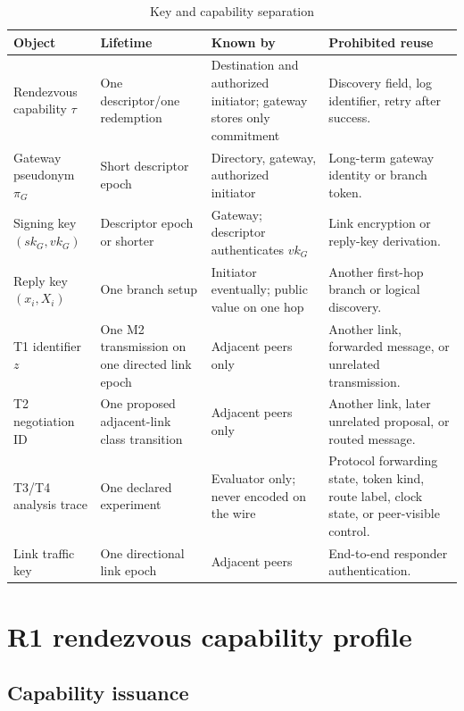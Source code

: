 \documentclass[11pt,oneside]{article}
\begin{document}
\begin{table}[ht]
\centering
\caption{Key and capability separation}
\label{tab:keyroles}
\begin{tabularx}{\textwidth}{@{}p{}p{}p{}X@{}}
\toprule
Object & Lifetime & Known by & Prohibited reuse \\
\midrule
Rendezvous capability $\tau$ & One descriptor/one redemption & Destination and authorized initiator; gateway stores only commitment & Discovery field, log identifier, retry after success. \\
Gateway pseudonym $\pi_G$ & Short descriptor epoch & Directory, gateway, authorized initiator & Long-term gateway identity or branch token. \\
Signing key $(sk_G,vk_G)$ & Descriptor epoch or shorter & Gateway; descriptor authenticates $vk_G$ & Link encryption or reply-key derivation. \\
Reply key $(x_i,X_i)$ & One branch setup & Initiator eventually; public value on one hop & Another first-hop branch or logical discovery. \\
T1 identifier $z$ & One M2 transmission on one directed link epoch & Adjacent peers only & Another link, forwarded message, or unrelated transmission. \\
T2 negotiation ID & One proposed adjacent-link class transition & Adjacent peers only & Another link, later unrelated proposal, or routed message. \\
T3/T4 analysis trace & One declared experiment & Evaluator only; never encoded on the wire & Protocol forwarding state, token kind, route label, clock state, or peer-visible control. \\
Link traffic key & One directional link epoch & Adjacent peers & End-to-end responder authentication. \\
\bottomrule
\end{tabularx}
\end{table}

\section{R1 rendezvous capability profile}
\label{sec:r1}

\subsection{Capability issuance}
\end{document}

